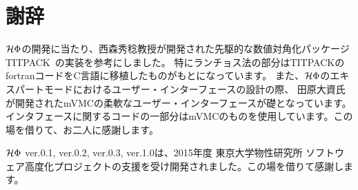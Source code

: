 \chapter{謝辞}
\label{Ch:ack}
$\mathcal{H} \Phi$の開発に当たり、西森秀稔教授が開発された先駆的な数値対角化パッケージTITPACK~\cite{titpack}の実装を参考にしました。
特にランチョス法の部分はTITPACKのfortranコードをC言語に移植したものがもとになっています。
また、$\mathcal{H} \Phi$のエキスパートモードにおけるユーザー・インターフェースの設計の際、
田原大資氏が開発されたmVMCの柔軟なユーザー・インターフェースが礎となっています。
インタフェースに関するコードの一部分はmVMCのものを使用しています。この場を借りて、お二人に感謝します。

$\mathcal{H} \Phi$ ver.0.1, ver.0.2, ver.0.3, ver.1.0は、2015年度 東京大学物性研究所 ソフトウェア高度化プロジェクトの支援を受け開発されました。この場を借りて感謝します。
